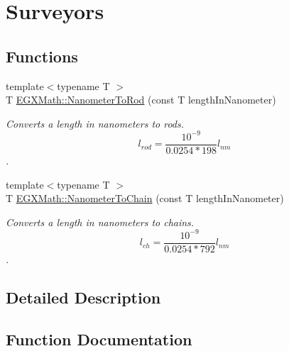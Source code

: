 \hypertarget{group___e_g_x_math-_conversions-_length_conversions-_s_i-_nanometer-_surveyors}{}\section{Surveyors}
\label{group___e_g_x_math-_conversions-_length_conversions-_s_i-_nanometer-_surveyors}
\subsection*{Functions}
\begin{DoxyCompactItemize}
\item 
{\footnotesize template$<$typename T $>$ }\\T \mbox{\hyperlink{group___e_g_x_math-_conversions-_length_conversions-_s_i-_nanometer-_surveyors_ga4677e0e0b8662f3786f43cea2f76e8d9}{E\+G\+X\+Math\+::\+Nanometer\+To\+Rod}} (const T length\+In\+Nanometer)
\begin{DoxyCompactList}\small\item\em Converts a length in nanometers to rods. \[ l_{rod}= \frac{10^{-9}}{0.0254 * 198} l_{nm} \]. \end{DoxyCompactList}\item 
{\footnotesize template$<$typename T $>$ }\\T \mbox{\hyperlink{group___e_g_x_math-_conversions-_length_conversions-_s_i-_nanometer-_surveyors_ga8da91a669cbde463135b21d48ffbdedc}{E\+G\+X\+Math\+::\+Nanometer\+To\+Chain}} (const T length\+In\+Nanometer)
\begin{DoxyCompactList}\small\item\em Converts a length in nanometers to chains. \[ l_{ch}= \frac{10^{-9}}{0.0254 * 792} l_{nm} \]. \end{DoxyCompactList}\end{DoxyCompactItemize}


\subsection{Detailed Description}


\subsection{Function Documentation}
\mbox{\label{group___e_g_x_math-_conversions-_length_conversions-_s_i-_nanometer-_surveyors_ga8da91a669cbde463135b21d48ffbdedc}} 

